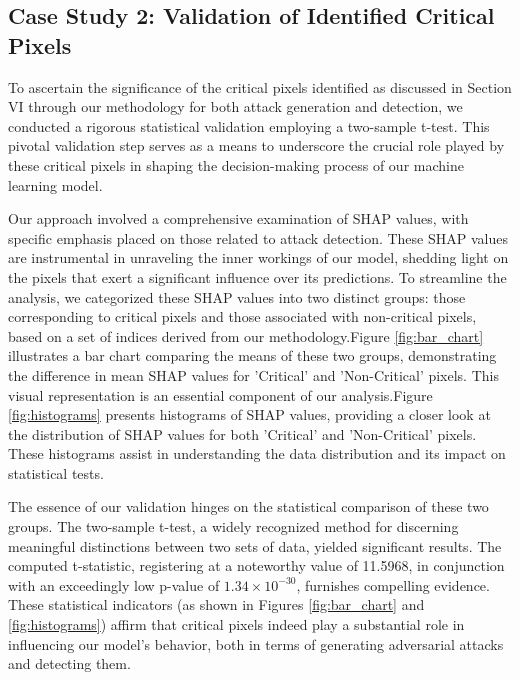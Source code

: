 \documentclass[10pt, conference, a4paper, final]{IEEEtran}
\begin{document}
    \subsection{Case Study 2: Validation of Identified Critical Pixels}

    To ascertain the significance of the critical pixels identified  as discussed in Section VI through our methodology for both attack 
    generation and detection, we conducted a rigorous statistical validation employing a two-sample t-test. 
    This pivotal validation step serves as a means to underscore the crucial role played by these critical pixels
    in shaping the decision-making process of our machine learning model.
    
    Our approach involved a comprehensive examination of SHAP values, with specific emphasis placed on those
     related to attack detection. These SHAP values are instrumental in unraveling the inner workings of our model, 
     shedding light on the pixels that exert a significant influence over its predictions.
      To streamline the analysis, we categorized these SHAP values into two distinct groups: 
      those corresponding to critical pixels and those associated with non-critical pixels, based on a set of 
      indices derived from our methodology.Figure \ref{fig:bar_chart} illustrates a bar chart comparing the means of these two groups, 
    demonstrating the difference in mean SHAP values for 'Critical' and 'Non-Critical' pixels. 
    This visual representation is an essential component of our analysis.Figure \ref{fig:histograms} presents histograms of SHAP values, providing a closer look at the 
    distribution of SHAP values for both 'Critical' and 'Non-Critical' pixels. These histograms assist 
    in understanding the data distribution and its impact on statistical tests.
    
    The essence of our validation hinges on the statistical comparison of these two groups. 
    The two-sample t-test, a widely recognized method for discerning meaningful distinctions 
    between two sets of data, yielded significant results. The computed t-statistic, registering at 
    a noteworthy value of 11.5968, in conjunction with an exceedingly low p-value of $1.34 \times 10^{-30}$, 
    furnishes compelling evidence. These statistical indicators (as shown in Figures \ref{fig:bar_chart} and 
    \ref{fig:histograms}) affirm that critical pixels indeed play a substantial role in influencing our model's 
    behavior, both in terms of generating adversarial attacks and detecting them.
    
\end{document}
